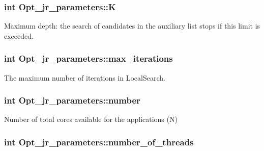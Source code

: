 \hypertarget{classOpt__jr__parameters_a71e4771571a4466646cd1433b038b8da}{
\subsubsection[{K}]{\setlength{\rightskip}{0pt plus 5cm}int Opt\-\_\-jr\-\_\-parameters\-::\-K\hspace{0.3cm}{\ttfamily [private]}}}\label{classOpt__jr__parameters_a71e4771571a4466646cd1433b038b8da}


Maximum depth\-: the search of candidates in the auxiliary list stops if this limit is exceeded. 

\hypertarget{classOpt__jr__parameters_aed595357c678f156b58e1010095b7efc}{
\subsubsection[{max\-\_\-iterations}]{\setlength{\rightskip}{0pt plus 5cm}int Opt\-\_\-jr\-\_\-parameters\-::max\-\_\-iterations\hspace{0.3cm}{\ttfamily [private]}}}\label{classOpt__jr__parameters_aed595357c678f156b58e1010095b7efc}


The maximum number of iterations in Local\-Search. 

\hypertarget{classOpt__jr__parameters_a3dfcb1783bcd6490733d10ced0833883}{
\subsubsection[{number}]{\setlength{\rightskip}{0pt plus 5cm}int Opt\-\_\-jr\-\_\-parameters\-::number\hspace{0.3cm}{\ttfamily [private]}}}\label{classOpt__jr__parameters_a3dfcb1783bcd6490733d10ced0833883}


Number of total cores available for the applications (N) 

\hypertarget{classOpt__jr__parameters_a90838c460af325a8a453ffb7fad21eaa}{
\subsubsection[{number\-\_\-of\-\_\-threads}]{\setlength{\rightskip}{0pt plus 5cm}int Opt\-\_\-jr\-\_\-parameters\-::number\-\_\-of\-\_\-threads\hspace{0.3cm}{\ttfamily [private]}}}\label{classOpt__jr__parameters_a90838c460af325a8a453ffb7fad21eaa}


